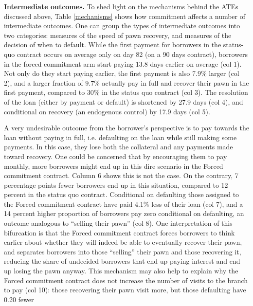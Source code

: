 \documentclass[ecta,nameyear,final]{econsocart}
\begin{document}
\noindent \textbf{Intermediate outcomes.} To shed light on the mechanisms behind the ATEs discussed above, Table \ref{mechanisms} shows how commitment affects a number of intermediate outcomes. One can group the types of intermediate outcomes into two categories: measures of the speed of pawn recovery, and measures of the decision of when to default. While the first payment for borrowers in the status-quo contract occurs on average only on day 82 (on a 90 days contract), borrowers in the forced commitment arm start paying 13.8 days earlier on average (col 1). Not only do they start paying earlier, the first payment is also 7.9\% larger (col 2), and a larger fraction of 9.7\% actually pay in full and recover their pawn in the first payment, compared to 30\% in the status quo contract (col 3). The resolution of the loan (either by payment or default) is shortened by 27.9 days (col 4), and conditional on recovery (an endogenous control) by 17.9 days (col 5).

A very undesirable outcome from the borrower's perspective is to pay towards the loan without paying in full, i.e. defaulting on the loan while still making some payments. In this case, they lose both the collateral and any payments made toward recovery. One could be concerned that by encouraging them to pay monthly, more borrowers might end up in this dire scenario in the Forced commitment contract. Column 6 shows this is not the case. On the contrary, 7 percentage points fewer borrowers end up in this situation, compared to 12 percent in the status quo contract. Conditional on defaulting those assigned to the Forced commitment contract have paid 4.1\% less of their loan (col 7), and a 14 percent higher proportion of borrowers pay zero conditional on defaulting, an outcome analogous to
``selling their pawn'' (col 8). One interpretation of this bifurcation is that the Forced commitment contract forces borrowers to think earlier about whether they will indeed be able to eventually recover their pawn, and separates borrowers into those ``selling'' their pawn and those recovering it, reducing the share of undecided borrowers that end up paying interest and end up losing the pawn anyway. This mechanism may also help to explain why the Forced commitment contract does not increase the number of visits to the branch to pay (col 10): those recovering their pawn visit more, but those defaulting have 0.20 fewer
\end{document}
